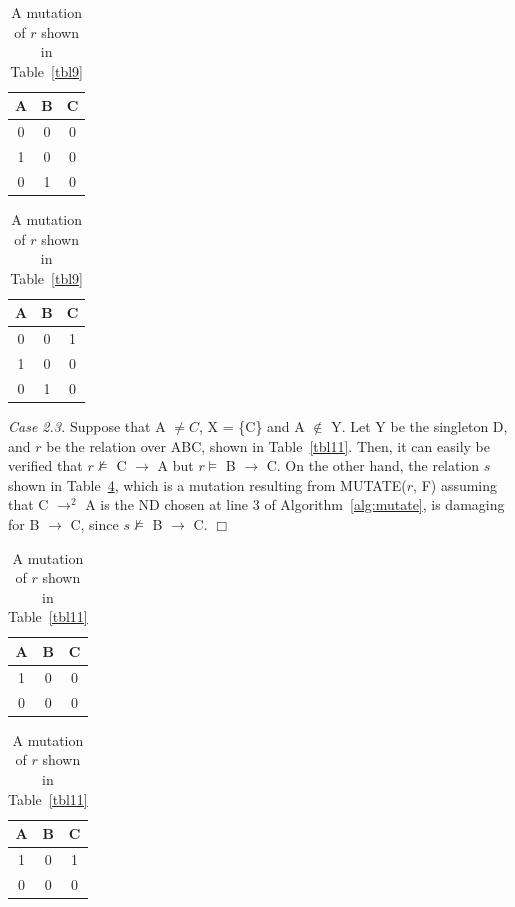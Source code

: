 \begin{table}[ht]
\begin{minipage}[b]{7cm}
\begin{center}
\begin{tabular}{|c|c|c|} \hline
A & B & C \\ \hline
0 & 0 & 0 \\
1 & 0 & 0 \\ 
0 & 1 & 0 \\ \hline
\end{tabular}
\end{center}
\caption{\label{tbl9} Example relation for Case 2.2.} 
\end{minipage}
\hfill
\begin{minipage}[b]{7cm}
\begin{center}
\begin{tabular}{|c|c|c|} \hline
A & B & C \\ \hline
0 & 0 & 1 \\
1 & 0 & 0 \\ 
0 & 1 & 0 \\ \hline
\end{tabular}
\end{center}
\caption{\label{tbl10} A mutation of $r$ shown in Table~\ref{tbl9}} 
\end{minipage}
\end{table}

{\em Case 2.3.}
Suppose that A $\not= C$, X = \{C\} and A $\not\in$ Y. 
Let Y be the singleton D,
and $r$ be the relation over ABC, shown in Table~\ref{tbl11}.
Then, it can easily be verified that 
$r \not\models$ C $\to$ A but $r \models$ B $\to$ C.
On the other hand, the relation $s$ shown in Table~\ref{tbl12},
which is a mutation resulting from MUTATE($r$, F) assuming that 
C $\to^2$ A is the ND chosen at line 3 of Algorithm~\ref{alg:mutate},
is damaging for B $\to$ C, since $s \not\models$ B $\to$ C.
\quad $\Box$
\medskip

\begin{table}[ht]
\begin{minipage}[b]{7cm}
\begin{center}
\begin{tabular}{|c|c|c|} \hline
A & B & C \\ \hline
1 & 0 & 0 \\
0 & 0 & 0 \\ \hline
\end{tabular}
\end{center}
\caption{\label{tbl11} Example relation for Case 2.3} 
\end{minipage}
\hfill
\begin{minipage}[b]{7cm}
\begin{center}
\begin{tabular}{|c|c|c|} \hline
A & B & C \\ \hline
1 & 0 & 1 \\
0 & 0 & 0 \\ \hline
\end{tabular}
\end{center}
\caption{\label{tbl12} A mutation of $r$ shown in Table~\ref{tbl11}} 
\end{minipage}
\end{table}

